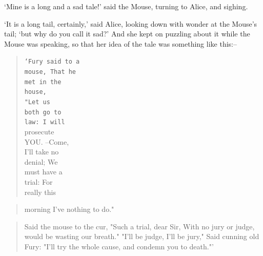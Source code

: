 \documentclass{article}
\begin{document}
`Mine is a long and a sad tale!' said the Mouse, turning to Alice, and sighing.

`It is a long tail, certainly,' said Alice, looking down with wonder at the Mouse's tail; `but why do you call it sad?' And she kept on puzzling about it while the Mouse was speaking, so that her idea of the tale was something like this:--

\begin{verse}

\hspace{3em}\texttt{`Fury said to a}\\
\hspace{2.8em}\texttt{mouse, That he}\\
\hspace{1.5em}\texttt{met in the}\\
\hspace{1em}\texttt{house,}\\
\hspace{0em}\texttt{"Let us}\\
\hspace{1em}\texttt{both go to}\\
\hspace{1.8em}\texttt{law:  I will}\\
                  prosecute\\
                    YOU.  --Come,\\
                       I'll take no\\
                        denial; We\\
                     must have a\\
                 trial:  For\\
              really this\\
\end{verse}

\begin{verse}

           morning I've
          nothing
         to do."
         
\end{verse}

\begin{verse}

           Said the
             mouse to the
               cur, "Such
                 a trial,
                   dear Sir,
                         With
                     no jury
                  or judge,
                would be
              wasting
             our
              breath."
               "I'll be
                 judge, I'll
                   be jury,"
                         Said
                    cunning
                      old Fury:
                     "I'll
                      try the
                         whole
                          cause,
                             and
                        condemn
                       you
                      to
                       death."'
\end{verse}                      
                       
\end{document}
